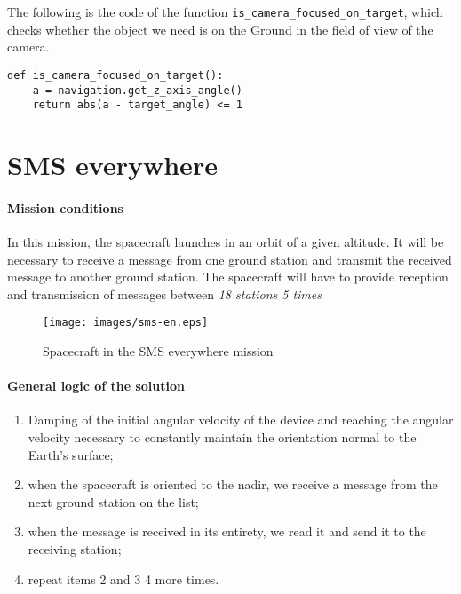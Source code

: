 \documentclass[12pt,a4paper]{article}
\begin{document}
The following is the code of the function \verb'is_camera_focused_on_target', which checks whether the object we need is on the Ground in the field of view of the camera.

\begin{verbatim}
def is_camera_focused_on_target():
    a = navigation.get_z_axis_angle()
    return abs(a - target_angle) <= 1
\end{verbatim}

\section{SMS everywhere}

\paragraph{Mission conditions} In this mission, the spacecraft launches in an orbit of a given altitude. It will be necessary to receive a message from one ground station and transmit the received message to another ground station. The spacecraft will have to provide reception and transmission of messages between \emph{18 stations 5 times}

\begin{figure}[tbh]
  \begin{center}
    \texttt{[image: images/sms-en.eps]}
    \caption{Spacecraft in the SMS everywhere mission}
    \label{Pic:SMS-en}
  \end{center}
\end{figure}


\paragraph{General logic of the solution} 

\begin{enumerate}
\item Damping of the initial angular velocity of the device and reaching the angular velocity necessary to constantly maintain the orientation normal to the Earth's surface;
\item when the spacecraft is oriented to the nadir, we receive a message from the next ground station on the list;
\item when the message is received in its entirety, we read it and send it to the receiving station;
\item repeat items 2 and 3 4 more times.
\end{enumerate}
\end{document}

